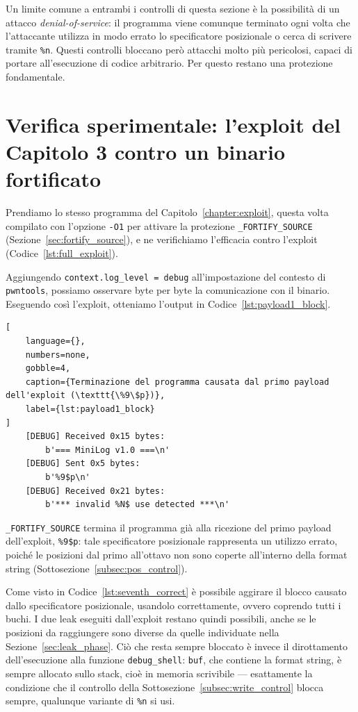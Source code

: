 Un limite comune a entrambi i controlli di questa sezione è la possibilità di un attacco \emph{denial-of-service}: il programma viene comunque terminato ogni volta che l'attaccante utilizza in modo errato lo specificatore posizionale o cerca di scrivere tramite \texttt{\%n}. Questi controlli bloccano però attacchi molto più pericolosi, capaci di portare all'esecuzione di codice arbitrario. Per questo restano una protezione fondamentale.


\section{Verifica sperimentale: l'exploit del Capitolo 3 contro un binario fortificato}\label{sec:fortify_verify}
Prendiamo lo stesso programma del Capitolo~\ref{chapter:exploit}, questa volta compilato con l'opzione \texttt{-O1} per attivare la protezione \texttt{\_FORTIFY\_SOURCE} (Sezione~\ref{sec:fortify_source}), e ne verifichiamo l'efficacia contro l'exploit (Codice~\ref{lst:full_exploit}).
 
Aggiungendo \texttt{context.log\_level = \textquotesingle{}debug\textquotesingle} all'impostazione del contesto di \texttt{pwntools}, possiamo osservare byte per byte la comunicazione con il binario. Eseguendo così l'exploit, otteniamo l'output in Codice~\ref{lst:payload1_block}.
\begin{lstlisting}[
    language={},
    numbers=none,
    gobble=4,
    caption={Terminazione del programma causata dal primo payload dell'exploit (\texttt{\%9\$p})},
    label={lst:payload1_block}
]
    [DEBUG] Received 0x15 bytes:
        b'=== MiniLog v1.0 ===\n'
    [DEBUG] Sent 0x5 bytes:
        b'%9$p\n'
    [DEBUG] Received 0x21 bytes:
        b'*** invalid %N$ use detected ***\n'
\end{lstlisting}
\texttt{\_FORTIFY\_SOURCE} termina il programma già alla ricezione del primo payload dell'exploit, \texttt{\%9\$p}: tale specificatore posizionale rappresenta un utilizzo errato, poiché le posizioni dal primo all'ottavo non sono coperte all'interno della format string (Sottosezione~\ref{subsec:pos_control}).

Come visto in Codice~\ref{lst:seventh_correct} è possibile aggirare il blocco causato dallo specificatore posizionale, usandolo correttamente, ovvero coprendo tutti i buchi. I due leak eseguiti dall'exploit restano quindi possibili, anche se le posizioni da raggiungere sono diverse da quelle individuate nella Sezione~\ref{sec:leak_phase}.
Ciò che resta sempre bloccato è invece il dirottamento dell'esecuzione alla funzione \texttt{debug\_shell}: \texttt{buf}, che contiene la format string, è sempre allocato sullo stack, cioè in memoria scrivibile --- esattamente la condizione che il controllo della Sottosezione~\ref{subsec:write_control} blocca sempre, qualunque variante di \texttt{\%n} si usi.

